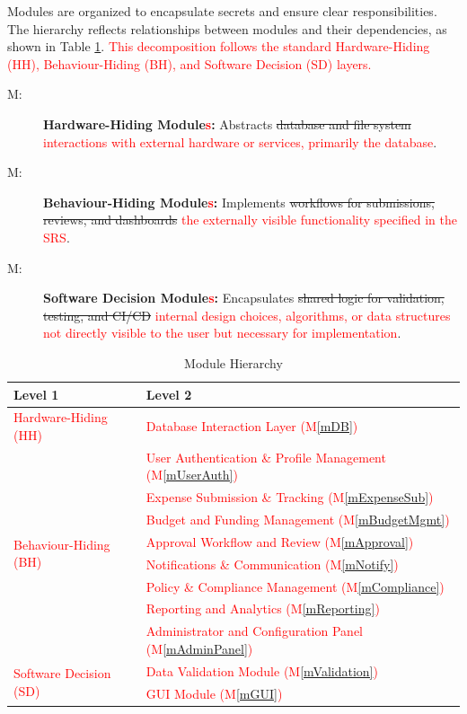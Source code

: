 \documentclass[12pt, titlepage]{article}
\newcounter{mnum}
\newcommand{\mthemnum}{M\themnum}
\newcommand{\mref}[1]{M\ref{#1}}
\begin{document}
Modules are organized to encapsulate secrets and ensure clear responsibilities. The hierarchy reflects relationships between modules and their dependencies, as shown in Table \ref{TblMH}. \textcolor{red}{This decomposition follows the standard Hardware-Hiding (HH), Behaviour-Hiding (BH), and Software Decision (SD) layers.}

\begin{description}
\item [ \mthemnum \label{mHH}:]
\textbf{Hardware-Hiding Module\textcolor{red}{s}:} Abstracts \sout{database and file system} \textcolor{red}{interactions with external hardware or services, primarily the database}.
\item [ \mthemnum \label{mBH}:]
\textbf{Behaviour-Hiding Module\textcolor{red}{s}:} Implements \sout{workflows for submissions, reviews, and dashboards} \textcolor{red}{the externally visible functionality specified in the SRS}.
\item [ \mthemnum \label{mSD}:]
\textbf{Software Decision Module\textcolor{red}{s}:} Encapsulates \sout{shared logic for validation, testing, and CI/CD} \textcolor{red}{internal design choices, algorithms, or data structures not directly visible to the user but necessary for implementation}.
\end{description}

\begin{table}[H]
\centering
\renewcommand{\arraystretch}{1.5}
\begin{tabular}{p{} p{}}
\toprule
\textbf{Level 1} & \textbf{Level 2}\\
\midrule
\textcolor{red}{Hardware-Hiding (HH)} & \textcolor{red}{Database Interaction Layer (\mref{mDB})} \\
\midrule
\multirow{8}{0.3\textwidth}{\textcolor{red}{Behaviour-Hiding (BH)}}
& \textcolor{red}{User Authentication \& Profile Management (\mref{mUserAuth})} \\ 
& \textcolor{red}{Expense Submission \& Tracking (\mref{mExpenseSub})} \\ 
& \textcolor{red}{Budget and Funding Management (\mref{mBudgetMgmt})} \\ 
& \textcolor{red}{Approval Workflow and Review (\mref{mApproval})} \\ 
& \textcolor{red}{Notifications \& Communication (\mref{mNotify})} \\ 
& \textcolor{red}{Policy \& Compliance Management (\mref{mCompliance})} \\ 
& \textcolor{red}{Reporting and Analytics (\mref{mReporting})} \\ 
& \textcolor{red}{Administrator and Configuration Panel (\mref{mAdminPanel})} \\ 
\midrule
\multirow{2}{0.3\textwidth}{\textcolor{red}{Software Decision (SD)}} 
& \textcolor{red}{Data Validation Module (\mref{mValidation})} \\
& \textcolor{red}{GUI Module (\mref{mGUI})} \\

\bottomrule
\end{tabular}
\caption{Module Hierarchy}
\label{TblMH}
\end{table}
\end{document}
